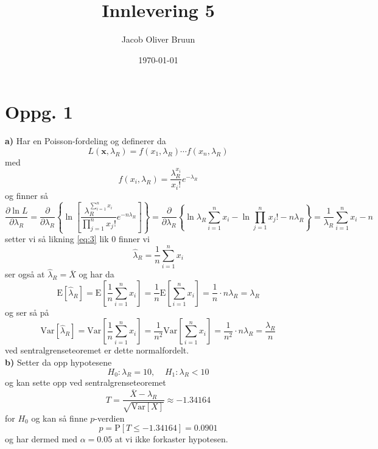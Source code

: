 \documentclass{report}
\title{Innlevering 5}
\author{Jacob Oliver Bruun}
\date{\today}
\newcommand{\bbrack}[1]{\left[ #1 \right]}
\newcommand{\cbrack}[1]{\left\lbrace #1 \right\rbrace}
\newcommand{\Var}[1]{\text{Var} \bbrack{ #1 }}
\newcommand{\fvv}[1]{\text{E} \bbrack{ #1 }}
\newcommand{\Prob}[1]{\text{P} \bbrack{ #1 }}
\begin{document}
\section*{Oppg. 1}
\textbf{a)}
Har en Poisson-fordeling og definerer da
\begin{equation}
  \label{eq:1}
  L(\mathbf{x}, \lambda_{R}) = f(x_{1}, \lambda_{R}) \cdots f(x_{n}, \lambda_{R})
\end{equation}
med
\begin{equation}
  \label{eq:2}
  f(x_{i}, \lambda_{R}) = \frac{\lambda_{R}^{x_{i}}}{x_{i}!} e^{-\lambda_{R}}
\end{equation}
og finner så
\begin{equation}
  \label{eq:3}
  \frac{\partial \ln L}{\partial \lambda_{R}} = \frac{\partial}{\partial \lambda_{R}} \cbrack{ \ln \bbrack{ \frac{\lambda_{R}^{\sum_{i=1}^{n} x_{i}}}{\prod_{j=1}^{n}x_{j}!} e^{-n\lambda_{R}} } } = \frac{\partial}{\partial \lambda_{R}} \cbrack{ \ln \lambda_{R} \sum_{i=1}^{n}x_{i} - \ln \prod_{j=1}^{n}x_{j}! - n\lambda_{R}} = \frac{1}{\lambda_{R}} \sum_{i=1}^{n}x_{i} - n
\end{equation}
setter vi så likning \eqref{eq:3} lik 0 finner vi
\begin{equation}
  \label{eq:4}
  \widehat{\lambda}_{R} = \frac{1}{n} \sum_{i=1}^{n} x_{i}
\end{equation}
ser også at $\widehat{\lambda}_{R} = \overline{X}$ og har da
\begin{equation}
  \label{eq:5}
  \fvv{\widehat{\lambda}_{R}} = \fvv{ \frac{1}{n} \sum_{i=1}^{n} x_{i} } = \frac{1}{n} \fvv{ \sum_{i=1}^{n} x_{i}} = \frac{1}{n} \cdot n\lambda_{R} = \lambda_{R}
\end{equation}
og ser så på
\begin{equation}
  \label{eq:6}
  \Var{\widehat{\lambda}_{R}} = \Var{\frac{1}{n} \sum_{i=1}^{n} x_{i}} = \frac{1}{n^{2}} \Var{\sum_{i=1}^{n} x_{i}} = \frac{1}{n^{2}} \cdot n\lambda_{R} = \frac{\lambda_{R}}{n}
\end{equation}
ved sentralgrenseteoremet er dette normalfordelt. \\

\textbf{b)}
Setter da opp hypotesene
\begin{equation}
  \label{eq:7}
  H_{0} : \lambda_{R} = 10, \;\;\;\; H_{1} : \lambda_{R} < 10
\end{equation}
og kan sette opp ved sentralgrenseteoremet
\begin{equation}
  \label{eq:8}
  T = \frac{\overline{X} - \lambda_{R}}{\sqrt{\Var{X}}} \approx -1.34164
\end{equation}
for $H_{0}$ og kan så finne $p$-verdien
\begin{equation}
  \label{eq:9}
  p = \Prob{ T \leq -1.34164 } = 0.0901
\end{equation}
og har dermed med $\alpha = 0.05$ at vi ikke forkaster hypotesen. \\
\end{document}
